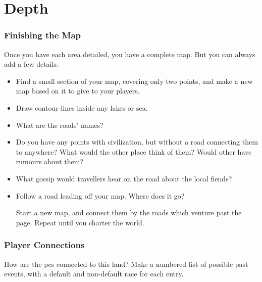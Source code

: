\section{Depth}

\begin{multicols}{2}

\subsubsection{Finishing the Map}

\noindent
Once you have each area detailed, you have a complete map.
But you can always add a few details.

\begin{itemize}
  \item
  Find a small section of your map, covering only two points, and make a new map based on it to give to your players.
  \item
  Draw contour-lines inside any lakes or sea.
  \item
  What are the roads' names?
  \item
  Do you have any points with civilization, but without a road connecting them to anywhere?
  What would the other place think of them?
  Would other have rumours about them?
  \item
  What gossip would travellers hear on the road about the local fiends?
  \item
  Follow a road leading off your map.
  Where does it go?

  Start a new map, and connect them by the roads which venture past the page.
  Repeat until you charter the world.
\end{itemize}

\bigLine

\subsubsection{Player Connections}

How are the \glspl{pc} connected to this land?
Make a numbered list of possible past events, with a default and non-default race for each entry.


\end{multicols}
